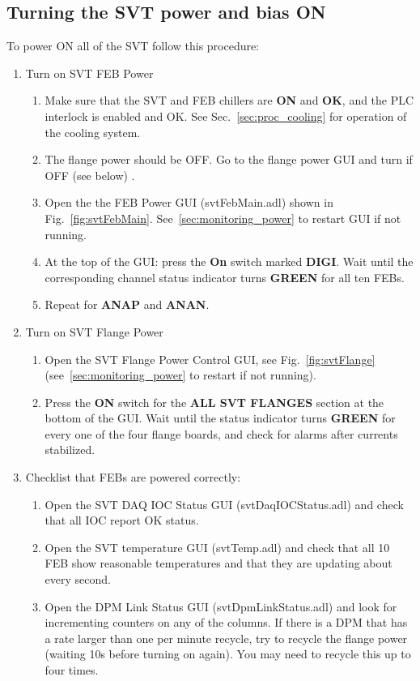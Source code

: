 \documentclass[12pt]{report}
\begin{document}
\subsection{Turning the SVT power and bias ON}
\label{sec:proc_voltages_allon}
To power ON all of the SVT follow this procedure:
\begin{enumerate}

\item Turn on SVT FEB Power
\begin{enumerate}
\item 
Make sure that the SVT and FEB chillers are \textbf{ON} and \textbf{OK}, and the PLC interlock is enabled and OK. See Sec.~\ref{sec:proc_cooling} for operation of the cooling system.
\item
The flange power should be OFF. Go to the flange power GUI and turn if OFF (see below) .
\item
Open the the FEB Power GUI (svtFebMain.adl) shown in Fig.~\ref{fig:svtFebMain}. See~\ref{sec:monitoring_power} to restart GUI if not running.
\item
At the top of the GUI: press the \textbf{On} switch marked \textbf{DIGI}. Wait until the corresponding channel status indicator turns \textbf{GREEN} for all ten FEBs. 
\item
Repeat for \textbf{ANAP} and \textbf{ANAN}.
\end{enumerate}


\item Turn on SVT Flange Power
\begin{enumerate}
\item
Open the SVT Flange Power Control GUI, see Fig.~\ref{fig:svtFlange}  (see~\ref{sec:monitoring_power} to restart if not running).
\item
Press the \textbf{ON} switch for the \textbf{ALL SVT FLANGES} section at the bottom of the GUI. Wait until the status indicator turns {\color{green} \textbf{GREEN}}  for every one of the four flange boards, and check for alarms after currents stabilized. 
\end{enumerate}



\item Checklist  that FEBs are powered correctly:
\begin{enumerate}
\item
Open the SVT DAQ IOC Status GUI (svtDaqIOCStatus.adl) and check that all IOC report OK status.
\item
Open the SVT temperature GUI (svtTemp.adl) and check that all 10 FEB show reasonable temperatures and that they are updating about every second.
\item
Open the DPM Link Status GUI (svtDpmLinkStatus.adl) and look for incrementing counters on any of the columns. \newline 
If there is a DPM that has a rate larger than one per minute recycle, try to recycle the flange power (waiting 10s before turning on again). You may need to recycle this up to four times.
\end{enumerate}






\end{enumerate}
\end{document}
